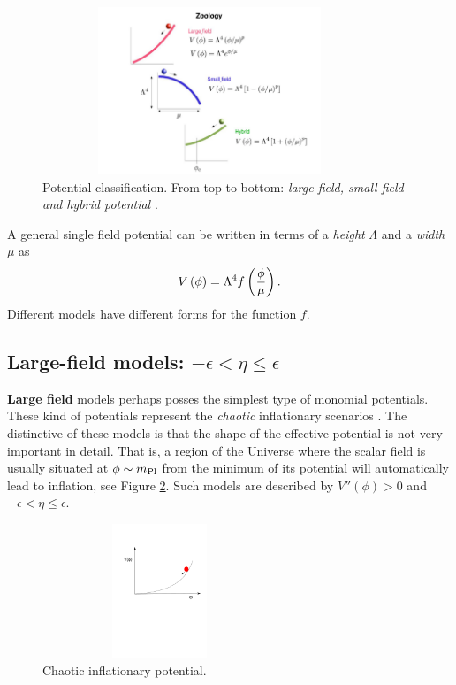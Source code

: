 \documentclass{rmaa}
\begin{document}
\begin{figure}[ht] 
  \includegraphics[trim = -50mm 1mm 10mm 1mm, clip, width=10cm, height=5cm]{zoology.pdf}
\caption{Potential classification. From top to bottom:
\textit{large field, small field and hybrid potential} \citep{Kinney2}.}
\label{fig:models}
\end{figure}
%
A general single field potential can be written in terms of a \textit{height} $\Lambda$ and a 
\textit{width} $\mu$ as
%
\begin{equation}
V\left(\phi\right) = \Lambda^4 f\left({\phi \over \mu}\right).
\end{equation}
%
Different models have different forms for the function $f$.

\subsection{Large-field models: $-\epsilon < \eta \leq \epsilon$}


\textbf{Large field} models perhaps posses the simplest type of monomial potentials.
These kind of potentials represent the \textit{chaotic} inflationary
scenarios \citep{Linde2}. The distinctive of these models is that the  
shape of the effective potential is not very important in detail. That is, a region
of the Universe where the scalar field is usually situated at $ \phi \sim m_{\rm Pl}$ 
from the minimum of its potential will automatically lead to inflation, see Figure \ref{fig:new1}. Such
models are described by $V''\left(\phi\right) > 0$ and $-\epsilon < \eta
\leq \epsilon$. 
\\

 \begin{figure}
 \begin{center}
  \includegraphics[trim = 20mm 120mm 10mm 40mm, clip, width=7cm, height=4cm]{new2.pdf}
	\caption{Chaotic inflationary potential.}
	\label{fig:new1}
\end{center}	
\end{figure}
\end{document}
